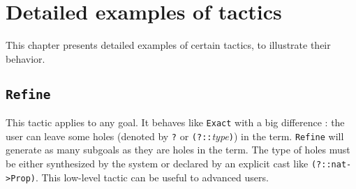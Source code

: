 \chapter{Detailed examples of tactics}
\label{Tactics-examples}

This chapter presents detailed examples of certain tactics, to
illustrate their behavior.

\section{\tt Refine}
\label{Refine-example}

This tactic applies to any goal. It behaves like {\tt Exact} with a
big difference : the user can leave some holes (denoted by \texttt{?} or 
{\tt (?::}{\it type}{\tt )}) in the term. 
{\tt Refine} will generate as many
subgoals as they are holes in the term. The type of holes must be
either synthesized by the system or declared by an
explicit cast like \verb|(?::nat->Prop)|. This low-level
tactic can be useful to advanced users.

\Example

